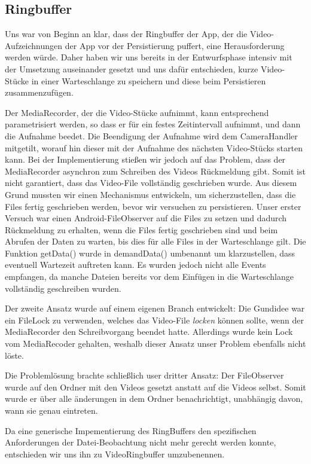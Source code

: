\subsection{Ringbuffer} \label{Ringbuffer}
Uns war von Beginn an klar, dass der Ringbuffer der App, der die Video-Aufzeichnungen der App vor der Persistierung puffert, eine Herausforderung werden würde. Daher haben wir uns bereits in der Entwurfsphase intensiv mit der Umsetzung auseinander gesetzt und uns dafür entschieden, kurze Video-Stücke in einer Warteschlange zu speichern und diese beim Persistieren zusammenzufügen. \par  
Der MediaRecorder, der die Video-Stücke aufnimmt, kann entsprechend parametrisiert werden, so dass er für ein festes Zeitintervall aufnimmt, und dann die Aufnahme beedet. Die Beendigung der Aufnahme wird dem CameraHandler mitgetilt, worauf hin dieser mit der Aufnahme des nächsten Video-Stücks starten kann. Bei der Implementierung stießen wir jedoch auf das Problem, dass der MediaRecorder asynchron zum Schreiben des Videos Rückmeldung gibt. Somit ist nicht garantiert, dass das Video-File vollständig geschrieben wurde. Aus diesem Grund mussten wir einen Mechanismus entwickeln, um sicherzustellen, dass die Files fertig geschrieben werden, bevor wir versuchen zu persistieren. 
Unser erster Versuch war einen Android-FileObserver auf die Files zu setzen und dadurch Rückmeldung zu erhalten, wenn die Files fertig geschrieben sind und beim Abrufen der Daten zu warten, bis dies für alle Files in der Warteschlange gilt. Die Funktion getData() wurde in demandData() umbenannt um klarzustellen, dass eventuell Wartezeit auftreten kann. Es wurden jedoch nicht alle Events empfangen, da manche Dateien bereits vor dem Einfügen in die Warteschlange vollständig geschreiben wurden.   \par  
Der zweite Ansatz wurde auf einem eigenen Branch entwickelt: Die Gundidee war ein FileLock zu verwenden, welches das Video-File \textit{locken} können sollte, wenn der MediaRecorder den Schreibvorgang beendet hatte. Allerdings wurde kein Lock vom MediaRecoder gehalten, weshalb dieser Ansatz unser Problem ebenfalls nicht löste. \par
Die Problemlösung brachte schließlich user dritter Ansatz: Der FileObserver wurde auf den Ordner mit den Videos gesetzt anstatt auf die Videos selbst. Somit wurde er über alle änderungen in dem Ordner benachrichtigt, unabhängig davon, wann sie genau eintreten.  \par  

Da eine generische Impementierung des RingBuffers den spezifischen Anforderungen der Datei-Beobachtung nicht mehr gerecht werden konnte, entschieden wir uns ihn zu VideoRingbuffer umzubenennen.  \par  

